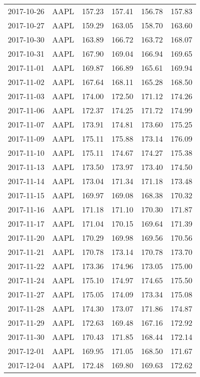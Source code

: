 \documentclass[12pt,a4paper]{report}
\begin{document}
\begin{appendices}
\begin{longtable}{llllll}
  2017-10-26 & AAPL & 157.23 & 157.41 & 156.78 & 157.83 \\ 
  2017-10-27 & AAPL & 159.29 & 163.05 & 158.70 & 163.60 \\ 
  2017-10-30 & AAPL & 163.89 & 166.72 & 163.72 & 168.07 \\ 
  2017-10-31 & AAPL & 167.90 & 169.04 & 166.94 & 169.65 \\ 
  2017-11-01 & AAPL & 169.87 & 166.89 & 165.61 & 169.94 \\ 
  2017-11-02 & AAPL & 167.64 & 168.11 & 165.28 & 168.50 \\ 
  2017-11-03 & AAPL & 174.00 & 172.50 & 171.12 & 174.26 \\ 
  2017-11-06 & AAPL & 172.37 & 174.25 & 171.72 & 174.99 \\ 
  2017-11-07 & AAPL & 173.91 & 174.81 & 173.60 & 175.25 \\ 
  2017-11-09 & AAPL & 175.11 & 175.88 & 173.14 & 176.09 \\ 
  2017-11-10 & AAPL & 175.11 & 174.67 & 174.27 & 175.38 \\ 
  2017-11-13 & AAPL & 173.50 & 173.97 & 173.40 & 174.50 \\ 
  2017-11-14 & AAPL & 173.04 & 171.34 & 171.18 & 173.48 \\ 
  2017-11-15 & AAPL & 169.97 & 169.08 & 168.38 & 170.32 \\ 
  2017-11-16 & AAPL & 171.18 & 171.10 & 170.30 & 171.87 \\ 
  2017-11-17 & AAPL & 171.04 & 170.15 & 169.64 & 171.39 \\ 
  2017-11-20 & AAPL & 170.29 & 169.98 & 169.56 & 170.56 \\ 
  2017-11-21 & AAPL & 170.78 & 173.14 & 170.78 & 173.70 \\ 
  2017-11-22 & AAPL & 173.36 & 174.96 & 173.05 & 175.00 \\ 
  2017-11-24 & AAPL & 175.10 & 174.97 & 174.65 & 175.50 \\ 
  2017-11-27 & AAPL & 175.05 & 174.09 & 173.34 & 175.08 \\ 
  2017-11-28 & AAPL & 174.30 & 173.07 & 171.86 & 174.87 \\ 
  2017-11-29 & AAPL & 172.63 & 169.48 & 167.16 & 172.92 \\ 
  2017-11-30 & AAPL & 170.43 & 171.85 & 168.44 & 172.14 \\ 
  2017-12-01 & AAPL & 169.95 & 171.05 & 168.50 & 171.67 \\ 
  2017-12-04 & AAPL & 172.48 & 169.80 & 169.63 & 172.62 \\ 

\end{longtable}
\end{appendices}
\end{document}
